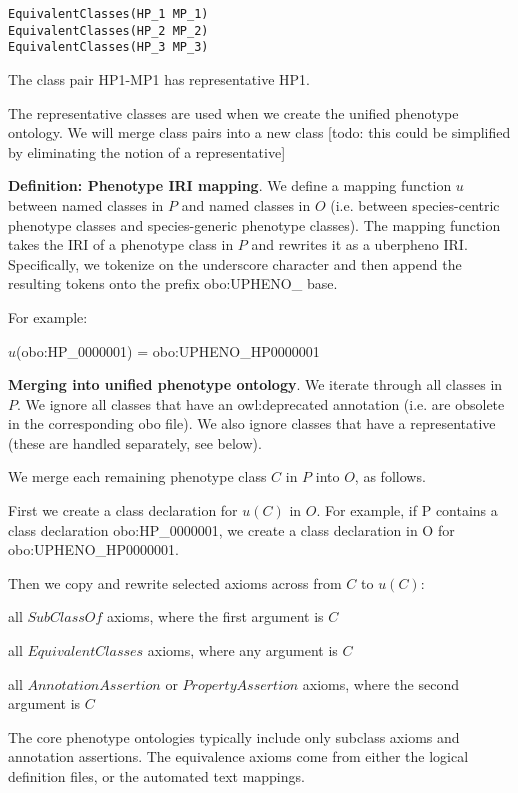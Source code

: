 \begin{verbatim}
EquivalentClasses(HP_1 MP_1)
EquivalentClasses(HP_2 MP_2)
EquivalentClasses(HP_3 MP_3)
\end{verbatim}

The class pair HP1-MP1 has representative HP1.

The representative classes are used when we create the unified
phenotype ontology. We will merge class pairs into a new class [todo:
this could be simplified by eliminating the notion of a representative]

\textbf{Definition: Phenotype IRI mapping}. We define a mapping
function $u$ between named classes in $P$ and named classes in $O$
(i.e. between species-centric phenotype classes and species-generic
phenotype classes). The mapping function takes the IRI of a phenotype
class in $P$ and rewrites it as a uberpheno IRI. Specifically, we
tokenize on the underscore character and then append the resulting
tokens onto the prefix obo:UPHENO_ base.

For example:

$u$(obo:HP\_0000001) =  obo:UPHENO\_HP0000001

\textbf{Merging into unified phenotype ontology}. We iterate
through all classes in $P$. We ignore all classes that have an
owl:deprecated annotation (i.e. are obsolete in the corresponding obo
file). We also ignore classes that have a representative (these are
handled separately, see below).

We merge each remaining phenotype class $C$ in $P$ into $O$, as follows.

First we create a class declaration for $u(C)$ in $O$. For example, if
P contains a class declaration obo:HP\_0000001, we create a class
declaration in O for obo:UPHENO\_HP0000001.

Then we copy and rewrite selected axioms across from $C$ to $u(C)$:

\begin{description}
\item all $SubClassOf$ axioms, where the first argument is $C$
\item all $EquivalentClasses$ axioms, where any argument is $C$
\item all $AnnotationAssertion$ or $PropertyAssertion$ axioms, where the second argument is $C$
\end{description}

The core phenotype ontologies typically include only subclass axioms
and annotation assertions. The equivalence axioms come from either the
logical definition files, or the automated text mappings.


